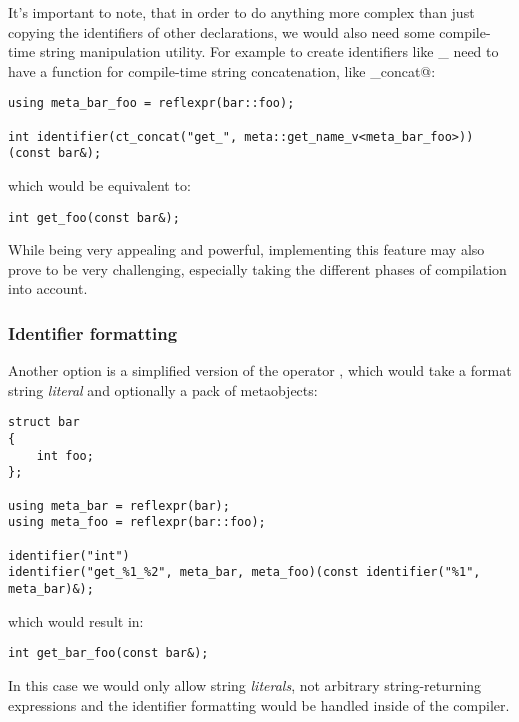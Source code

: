 It's important to note, that in order to do anything more complex than just
copying the identifiers of other declarations, we would also need some compile-time
string manipulation utility. For example to create identifiers like
\verb@get_%@ or \verb@set_%@ where \verb@%@ is a declaration name, we would
need to have a function for compile-time string concatenation, like
\verb@ct_concat@:

\begin{verbatim}
using meta_bar_foo = reflexpr(bar::foo);

int identifier(ct_concat("get_", meta::get_name_v<meta_bar_foo>))(const bar&);
\end{verbatim}

which would be equivalent to:

\begin{verbatim}
int get_foo(const bar&);
\end{verbatim}

While being very appealing and powerful, implementing this feature may
also prove to be very challenging, especially taking the different phases
of compilation into account.

\subsubsection{Identifier formatting}
\label{fut-ident-formatting}

Another option is a simplified version of the operator \verb@identifier@,
which would take a format string {\em literal} and optionally a pack of
 metaobjects:

\begin{verbatim}
struct bar
{
	int foo;
};

using meta_bar = reflexpr(bar);
using meta_foo = reflexpr(bar::foo);

identifier("int")
identifier("get_%1_%2", meta_bar, meta_foo)(const identifier("%1", meta_bar)&);
\end{verbatim}

which would result in:

\begin{verbatim}
int get_bar_foo(const bar&);
\end{verbatim}

In this case we would only allow string {\em literals}, not arbitrary
\verb@constexpr@ string-returning expressions and the identifier formatting
would be handled inside of the compiler.

